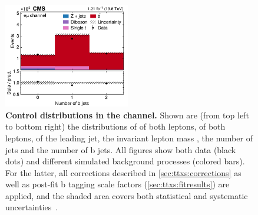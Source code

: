 \begin{figure}[!hp]
\hfill
\includegraphics[width=0.49\textwidth]{figures/ttxs/nbtag_em.pdf}
\caption{
    \textbf{Control distributions in the \emu channel.} Shown are (from top left to bottom right) the distributions of \pt of both leptons, \abseta of both leptons, \pt of the leading jet, the invariant lepton mass \mll, the number of jets and the number of b jets. All figures show both data (black dots) and different simulated background processes (colored bars). For the latter, all corrections described in \cref{sec:ttxs:corrections} as well as post-fit b tagging scale factors (\cref{sec:ttxs:fitresults}) are applied, and the shaded area covers both statistical and systematic uncertainties~\cite{CMS:TOP-22-012}.
}
\label{fig:ttxs:control_em}
\end{figure}

